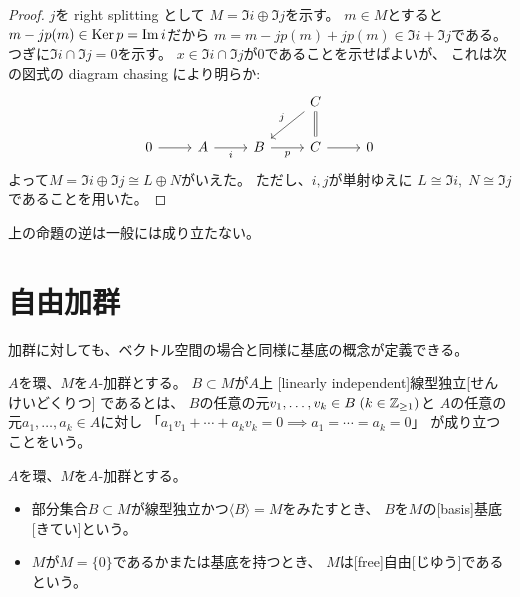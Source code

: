 \documentclass[report]{jlreq}
\begin{document}
\begin{proof}
    $j$を right splitting として
    $M = \Im i \oplus \Im j$を示す。
    $m \in M$とすると
    $m - jp(m) \in \operatorname{\mathrm{Ker}} p = \operatorname{\mathrm{Im}} i$だから
    $m = m - jp(m) + jp(m) \in \Im i + \Im j$である。
    つぎに$\Im i \cap \Im j = 0$を示す。
    $x \in \Im i \cap \Im j$が$0$であることを示せばよいが、
    これは次の図式の diagram chasing により明らか:
    \begin{equation}
        \begin{tikzcd}
            &&& C \ar{ld}[swap]{j} \\
            0 \ar{r}
                & A \ar{r}[swap]{i}
                & B \ar{r}[swap]{p}
                & C \ar[equal]{u} \ar{r}
                & 0
        \end{tikzcd}
    \end{equation}
    よって$M = \Im i \oplus \Im j \cong L \oplus N$がいえた。
    ただし、$i, j$が単射ゆえに
    $L \cong \Im i, \; N \cong \Im j$であることを用いた。
\end{proof}

\begin{example}[直和で書けても分裂するとは限らない]
    上の命題の逆は一般には成り立たない。
    \TODO{}
\end{example}




%
\section{自由加群}

加群に対しても、ベクトル空間の場合と同様に基底の概念が定義できる。

\begin{definition}[線型独立]
    $A$を環、$M$を$A$-加群とする。
    $B \subset M$が$A$上
    [linearly independent]{線型独立}[せんけいどくりつ]
    であるとは、
    $B$の任意の元$v_1, \dots, v_k \in B \; (k \in \mathbb{Z}_{\ge 1})$と
    $A$の任意の元$a_1, \dots, a_k \in A$に対し
    「$a_1 v_1 + \cdots + a_k v_k = 0 \implies a_1 = \cdots = a_k = 0$」
    が成り立つことをいう。
\end{definition}

\begin{definition}[自由加群]
    $A$を環、$M$を$A$-加群とする。
    \begin{itemize}
        \item 部分集合$B \subset M$が線型独立かつ$\langle B \rangle = M$をみたすとき、
            $B$を$M$の[basis]{基底}[きてい]という。
        \item $M$が$M = \{0\}$であるかまたは基底を持つとき、
            $M$は[free]{自由}[じゆう]であるという。
    \end{itemize}
\end{definition}
\end{document}
